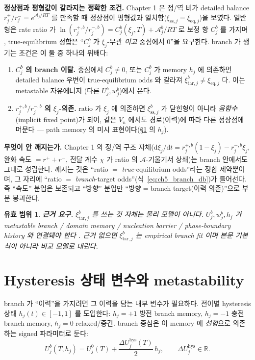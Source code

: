 \documentclass[11pt,a4paper]{article}
\newtheorem*{boundbox}{유효 범위}
\newcommand{\dd}{\mathrm{d}}
\newcommand{\eq}{\mathrm{eq}}
\newcommand{\sstat}{\mathrm{ss}}
\newcommand{\hys}{\mathrm{hys}}
\newcommand{\tar}{\mathrm{tar}}
\begin{document}
\textbf{정상점과 평형값이 갈라지는 정확한 조건.} Chapter 1 은 정/역 비가 detailed balance
$r_j^+/r_j^-=e^{\mathcal A_j/RT}$ 를 만족할 때 정상점이 평형값과 일치함($\xi_{\sstat,j}=\xi_{\eq,j}$)을 보였다.
일반형은 rate ratio 가 $\ln(r_j^{+,b}/r_j^{-,b})=C_j^b(\xi_j,T)+\mathcal A_j^b/RT$ 로 보정 항 $C_j^b$ 를 가지며
\cite{bazant2013}, true-equilibrium 정합은 ``$C_j^b$ 가 $\xi_j$-무관 \emph{이고} 중심에서 0''을 요구한다. branch 가 생기는 조건은
이 둘 중 하나의 위배다:
\begin{enumerate}[label=(\alph*),leftmargin=2.2em,itemsep=2pt]
\item \textbf{$C_j^b$ 의 branch 이탈.} 중심에서 $C_j^b\ne0$, 또는 $C_j^b$ 가 memory $h_j$ 에 의존하면 detailed
  balance 우변이 true-equilibrium odds 와 갈라져 $\xi_{\tar,j}^b\ne\xi_{\eq,j}$ 다. 이는 metastable 자유에너지
  (다른 $U_j^b,w_j^b$)에서 온다.
\item \textbf{$r_j^{+,b}/r_j^{-,b}$ 의 $\xi_j$-의존.} ratio 가 $\xi_j$ 에 의존하면 $\xi_{\sstat,j}^b$ 가 닫힌형이
  아니라 \emph{음함수}(implicit fixed point)가 되어, 같은 $V_n$ 에서도 경로(이력)에 따라 다른 정상점에 머문다 —
  path memory 의 미시 표현이다(\S\ref{sec:ch5_hstate} 의 $h_j$).
\end{enumerate}
\textbf{무엇이 안 깨지는가.} Chapter 1 의 정/역 구조 자체($\dd\xi_j/\dd t=r_j^{+,b}(1-\xi_j)-r_j^{-,b}\xi_j$,
완화 속도 $=r^++r^-$, 전달 계수 $\chi$ 가 ratio 의 $\mathcal A$-기울기서 상쇄)는 branch 안에서도 그대로 성립한다.
깨지는 것은 ``ratio $=$ \emph{true}-equilibrium odds''라는 정합 제약뿐이며, 그 자리에 ``ratio $=$ \emph{branch}-target
odds''(식~\eqref{eq:ch5_branch_db})가 들어선다. 즉 ``속도'' 분업은 보존되고 ``방향'' 분업만 ``방향$=$branch
target(이력 의존)''으로 부분 붕괴한다.

\begin{boundbox}
\textbf{근거 요구.} $\xi_{\tar,j}^b$ 를 쓰는 것 자체는 물리 모델이 아니다. $U_j^b,w_j^b,h_j$ 가 metastable
branch / domain memory / nucleation barrier / phase-boundary history 와 연결돼야 한다 \cite{dreyer2010,sethna1993}.
근거 없으면 $\xi_{\tar,j}^b$ 는 empirical branch fit 이며 본문 기본식이 아니라 비교 모델로 내린다.
\end{boundbox}

\section{Hysteresis 상태 변수와 metastability}\label{sec:ch5_hstate}
branch 가 ``이력''을 가지려면 그 이력을 담는 내부 변수가 필요하다. 전이별 hysteresis 상태 $h_j(t)\in[-1,1]$ 를
도입한다: $h_j=+1$ 방전 branch memory, $h_j=-1$ 충전 branch memory, $h_j=0$ relaxed/중간. branch 중심은 이
memory 에 \emph{선형}으로 의존하는 signed 파라미터로 둔다:
\begin{equation}
U_j^b(T,h_j)=U_j^0(T)+\frac{\Delta U_j^\hys(T)}{2}\,h_j,\qquad \Delta U_j^\hys\in\mathbb R.
\label{eq:ch5_hys_center}
\end{equation}
\end{document}
